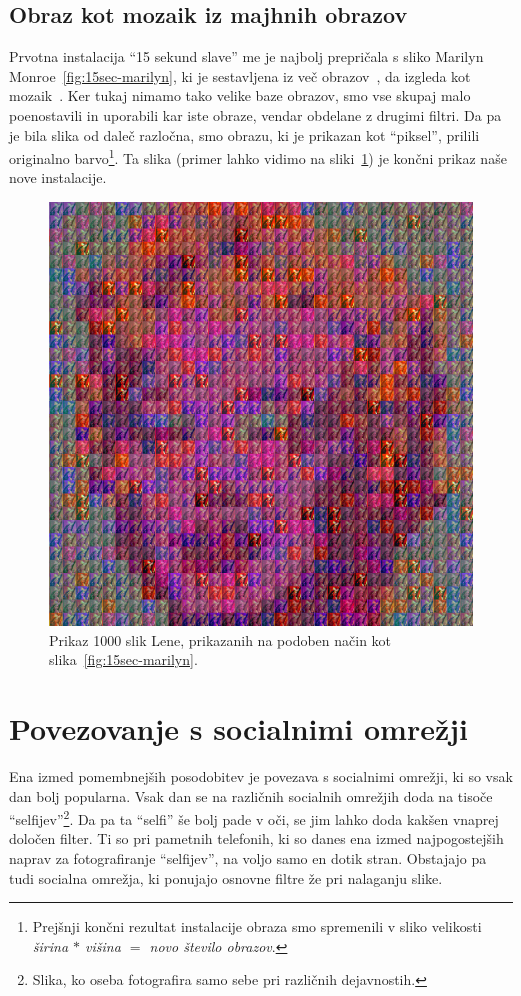 \documentclass[a4paper, 12pt]{book}
\begin{document}
\section{Obraz kot mozaik iz majhnih obrazov}
Prvotna instalacija ``15 sekund slave'' me je najbolj prepričala s sliko
Marilyn Monroe~\ref{fig:15sec-marilyn}, ki je sestavljena iz več
obrazov~\cite{katalog_solina}, da izgleda kot mozaik~\cite{thesisSasoStulac}.
Ker tukaj nimamo tako velike baze obrazov, smo vse skupaj malo poenostavili in
uporabili kar iste obraze, vendar obdelane z drugimi filtri. Da pa je bila
slika od daleč razločna, smo obrazu, ki je prikazan kot ``piksel'', prilili
originalno barvo\footnote{Prejšnji končni rezultat instalacije obraza smo
spremenili v sliko velikosti \textit{širina $*$ višina $=$ novo število
obrazov}.}. Ta slika (primer lahko vidimo na sliki~\ref{fig:FoF-marilyn}) je
končni prikaz naše nove instalacije.

\begin{figure}[!ht]
    \centering
    \includegraphics[width=\textwidth]{FoF-marilyn}
    \caption{Prikaz 1000 slik Lene, prikazanih na podoben način kot slika~\ref{fig:15sec-marilyn}.}
    \label{fig:FoF-marilyn}
\end{figure}


\chapter{Povezovanje s socialnimi omrežji}
\label{ch:socialNetwork}
Ena izmed pomembnejših posodobitev je povezava s socialnimi omrežji, ki so
vsak dan bolj popularna. Vsak dan se na različnih socialnih omrežjih doda na
tisoče ``selfijev''\footnote{Slika, ko oseba fotografira
samo sebe pri različnih dejavnostih.}. Da pa ta ``selfi'' še bolj pade v
oči, se jim lahko doda kakšen vnaprej določen filter. Ti so pri pametnih
telefonih, ki so danes ena izmed najpogostejših naprav za fotografiranje
``selfijev'', na voljo samo en dotik stran. Obstajajo pa tudi socialna
omrežja, ki ponujajo osnovne filtre že pri nalaganju slike.
\end{document}
